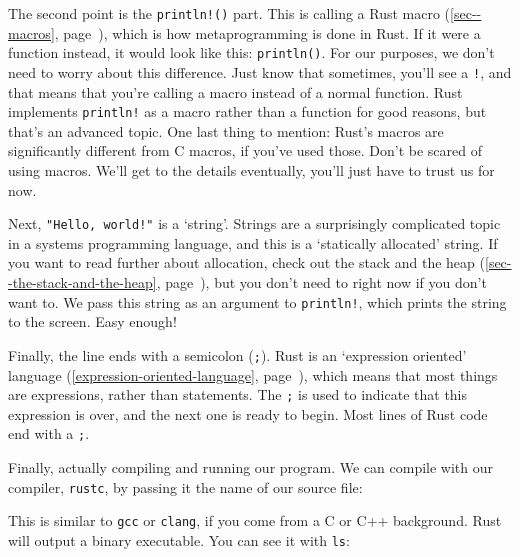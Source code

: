 \documentclass[a4paper,]{book}
\renewcommand*{\hyperref}[2][\ar]{%
  \def\ar{#2}%
  #2 (\autoref{#1}, page~\pageref{#1})}
\newenvironment{Shaded}{\begin{snugshade}}{\end{snugshade}}
\newcommand{\KeywordTok}[1]{\textcolor[rgb]{0.13,0.29,0.53}{\textbf{{#1}}}}
\newcommand{\NormalTok}[1]{{#1}}
\begin{document}
The second point is the \texttt{println!()} part. This is calling a Rust
\hyperref[sec--macros]{macro}, which is how metaprogramming is done in
Rust. If it were a function instead, it would look like this:
\texttt{println()}. For our purposes, we don't need to worry about this
difference. Just know that sometimes, you'll see a \texttt{!}, and that
means that you're calling a macro instead of a normal function. Rust
implements \texttt{println!} as a macro rather than a function for good
reasons, but that's an advanced topic. One last thing to mention: Rust's
macros are significantly different from C macros, if you've used those.
Don't be scared of using macros. We'll get to the details eventually,
you'll just have to trust us for now.

Next, \texttt{"Hello,\ world!"} is a `string'. Strings are a
surprisingly complicated topic in a systems programming language, and
this is a `statically allocated' string. If you want to read further
about allocation, check out \hyperref[sec--the-stack-and-the-heap]{the
stack and the heap}, but you don't need to right now if you don't want
to. We pass this string as an argument to \texttt{println!}, which
prints the string to the screen. Easy enough!

Finally, the line ends with a semicolon (\texttt{;}). Rust is an
\hyperref[expression-oriented-language]{`expression oriented' language},
which means that most things are expressions, rather than statements.
The \texttt{;} is used to indicate that this expression is over, and the
next one is ready to begin. Most lines of Rust code end with a
\texttt{;}.

Finally, actually compiling and running our program. We can compile with
our compiler, \texttt{rustc}, by passing it the name of our source file:

\begin{Shaded}
\end{Shaded}

This is similar to \texttt{gcc} or \texttt{clang}, if you come from a C
or C++ background. Rust will output a binary executable. You can see it
with \texttt{ls}:

\begin{Shaded}
\end{Shaded}
\end{document}
